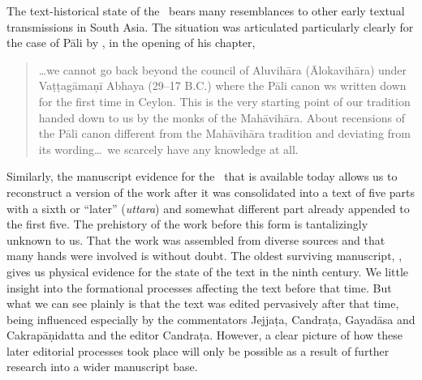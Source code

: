 The text-historical state of the \SS\ bears many resemblances to other early 
textual transmissions in South Asia.  The situation was articulated particularly 
clearly for the case of Pāli by \citet{hinu-1978}, in the opening of his chapter, 
\begin{quote}
    \ldots we cannot go back beyond the council of Aluvihāra (Ālokavihāra) under 
    Vaṭṭagāmaṇī Abhaya (29--17 B.C.) where the Pāli canon ws written down for 
    the first time in Ceylon.  This is the very starting point of our tradition 
    handed down to us by the monks of the Mahāvihāra.  About recensions of 
    the Pāli canon different from the Mahāvihāra tradition and deviating from its 
    wording\ldots\ we scarcely have any knowledge at all.
\end{quote}
Similarly, the manuscript evidence for the \SS\ that is available
today allows us to reconstruct a version of the work after it was
consolidated into a text of five parts with a sixth or “later”
(\emph{uttara}) and somewhat different part already appended to the
first five.  The prehistory of the work before this form is
tantalizingly unknown to us.  That the work was assembled from
diverse sources and that many hands were involved is without doubt.
The oldest surviving manuscript, , gives us
physical evidence for the state of the text in the ninth century.  We
little insight into the formational processes affecting the text
before that time.  But what we can see plainly is that the text was
edited pervasively after that time, being influenced especially by
the commentators Jejjaṭa, Candraṭa, Gayadāsa and Cakrapāṇidatta and
the editor Candraṭa. However, a
clear picture of how these later editorial processes took place will only be 
possible as a result of further research into a wider manuscript base.